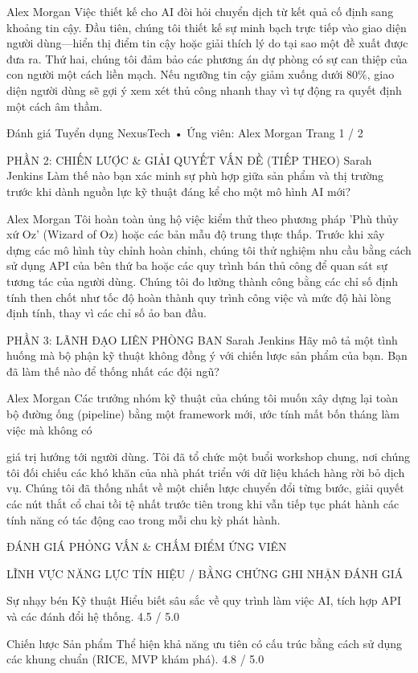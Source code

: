 \documentclass[12pt]{article}
\begin{document}
Alex Morgan
Việc thiết kế cho AI đòi hỏi chuyển dịch từ kết quả cố định sang khoảng tin cậy. Đầu tiên, chúng tôi thiết kế sự minh bạch trực tiếp vào giao diện người dùng—hiển thị điểm tin cậy hoặc giải thích lý do tại sao một đề xuất được đưa ra. Thứ hai, chúng tôi đảm bảo các phương án dự phòng có sự can thiệp của con người một cách liền mạch. Nếu ngưỡng tin cậy giảm xuống dưới 80\%, giao diện người dùng sẽ gợi ý xem xét thủ công nhanh thay vì tự động ra quyết định một cách âm thầm.

Đánh giá Tuyển dụng NexusTech • Ứng viên: Alex Morgan
Trang 1 / 2

PHẦN 2: CHIẾN LƯỢC \& GIẢI QUYẾT VẤN ĐỀ (TIẾP THEO)
Sarah Jenkins
Làm thế nào bạn xác minh sự phù hợp giữa sản phẩm và thị trường trước khi dành nguồn lực kỹ thuật đáng kể cho một mô hình AI mới?

Alex Morgan
Tôi hoàn toàn ủng hộ việc kiểm thử theo phương pháp 'Phù thủy xứ Oz' (Wizard of Oz) hoặc các bản mẫu độ trung thực thấp. Trước khi xây dựng các mô hình tùy chỉnh hoàn chỉnh, chúng tôi thử nghiệm nhu cầu bằng cách sử dụng API của bên thứ ba hoặc các quy trình bán thủ công để quan sát sự tương tác của người dùng. Chúng tôi đo lường thành công bằng các chỉ số định tính then chốt như tốc độ hoàn thành quy trình công việc và mức độ hài lòng định tính, thay vì các chỉ số ảo ban đầu.

PHẦN 3: LÃNH ĐẠO LIÊN PHÒNG BAN
Sarah Jenkins
Hãy mô tả một tình huống mà bộ phận kỹ thuật không đồng ý với chiến lược sản phẩm của bạn. Bạn đã làm thế nào để thống nhất các đội ngũ?

Alex Morgan
Các trưởng nhóm kỹ thuật của chúng tôi muốn xây dựng lại toàn bộ đường ống (pipeline) bằng một framework mới, ước tính mất bốn tháng làm việc mà không có

giá trị hướng tới người dùng. Tôi đã tổ chức một buổi workshop chung, nơi chúng tôi đối chiếu các khó khăn của nhà phát triển với dữ liệu khách hàng rời bỏ dịch vụ. Chúng tôi đã thống nhất về một chiến lược chuyển đổi từng bước, giải quyết các nút thắt cổ chai tồi tệ nhất trước tiên trong khi vẫn tiếp tục phát hành các tính năng có tác động cao trong mỗi chu kỳ phát hành.

ĐÁNH GIÁ PHỎNG VẤN \& CHẤM ĐIỂM ỨNG VIÊN

LĨNH VỰC NĂNG LỰC
TÍN HIỆU / BẰNG CHỨNG GHI NHẬN
ĐÁNH GIÁ

Sự nhạy bén Kỹ thuật
Hiểu biết sâu sắc về quy trình làm việc AI, tích hợp API và các đánh đổi hệ thống.
4.5 / 5.0

Chiến lược Sản phẩm
Thể hiện khả năng ưu tiên có cấu trúc bằng cách sử dụng các khung chuẩn (RICE, MVP khám phá).
4.8 / 5.0
\end{document}
